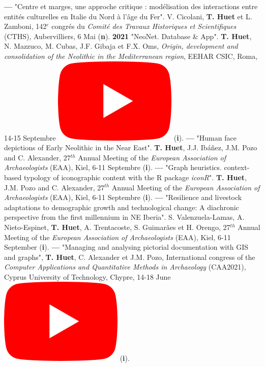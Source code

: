 \documentclass{article}
\begin{document}
\textbf{--- }"Centre et marges, une approche critique : modélisation des interactions entre entités culturelles en Italie du Nord à l'âge du Fer". V. Cicolani, \textbf{T. Huet} et L. Zamboni, 142${}^{e}$ congr\'{e}s du \textit{Comit\'{e} des Travaux Historiques et Scientifiques} (CTHS), Aubervilliers, 6 Mai (\textbf{n}).
\smallbreak
\textbf{2021 }"NeoNet. Database \& App". \textbf{T. Huet}, N. Mazzuco, M. Cubas, J.F. Gibaja et F.X. Oms, \textit{Origin, development and consolidation of the Neolithic in the Mediterranean region}, EEHAR CSIC, Roma, 14-15 Septembre \href{https://youtu.be/GM2niot0XwE?t=10700}{\includegraphics[scale=0.2]{icon_youtube}} (\textbf{i}).
\smallbreak
\textbf{--- }"Human face depictions of Early Neolithic in the Near East". \textbf{T. Huet}, J.J. Ibáñez, J.M. Pozo and C. Alexander, 27${}^{th}$ Annual Meeting of the \textit{European Association of Archaeologists} (EAA), Kiel, 6-11 Septembre (\textbf{i}).
\smallbreak
\textbf{--- }"Graph heuristics. context-based typology of iconographic content with the R package \textit{iconR}". \textbf{T. Huet}, J.M. Pozo and C. Alexander, 27${}^{th}$ Annual Meeting of the \textit{European Association of Archaeologists} (EAA), Kiel, 6-11 Septembre (\textbf{i}).
\smallbreak
\textbf{--- }"Resilience and livestock adaptations to demographic growth and technological change: A diachronic perspective from the first millennium in NE Iberia". S. Valenzuela-Lamas, A. Nieto-Espinet, \textbf{T. Huet}, A. Trentacoste, S. Guimarães et H. Orengo, 27${}^{th}$ Annual Meeting of the \textit{European Association of Archaeologists} (EAA), Kiel, 6-11 September (\textbf{i}).
\smallbreak
\textbf{--- }"Managing and analysing pictorial documentation with GIS and graphs", \textbf{T. Huet}, C. Alexander et J.M. Pozo, International congress of the \textit{Computer Applications and Quantitative Methods in Archaeology} (CAA2021), Cyprus University of Technology, Chypre, 14-18 June \href{https://youtu.be/tUhHhzGSgbk?t=4950}{\includegraphics[scale=0.2]{icon_youtube}} (\textbf{i}).
\end{document}
